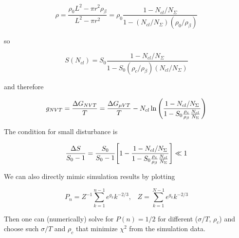 \documentclass[a4paper,12pt]{article} %
\begin{document}
\begin{equation}
\rho = \frac{\rho_0 L^2 - \pi r^2 \rho_{\beta}}{L^2 - \pi r^2} = \rho_0 \frac{1 - N_{cl} / N_{\Sigma}}{1 - (N_{cl} / N_{\Sigma})(\rho_0 / \rho_{\beta})}
\end{equation}

so

\begin{equation}
S(N_{cl}) = S_0 \frac{1 - N_{cl} / N_{\Sigma}}{1 - S_0 (\rho_c / \rho_{\beta})(N_{cl} / N_{\Sigma})}
\end{equation}

and therefore

\begin{equation}
g_{NVT} = \frac{\Delta G_{N V T}}{T} = \frac{\Delta G_{\mu V T}}{T} - N_{cl} \ln \qty(\frac{1 - N_{cl} / N_{\Sigma}}{1 - S_0 \frac{\rho_c}{\rho_{\beta}} \frac{N_{cl}}{N_{\Sigma}}})
\end{equation}

The condition for small disturbance is

\begin{equation}
\frac{\Delta S}{S_0 - 1} = \frac{S_0}{S_0 - 1} \qty[1 - \frac{1 - N_{cl} / N_{\Sigma}}{1 - S_0 \frac{\rho_c}{\rho_{\beta}} \frac{N_{cl}}{N_{\Sigma}}}] \ll 1
\end{equation}

We can also directly mimic simulation results by plotting

\begin{equation}
P_n = Z^{-1} \sum_{k=1}^{n-1} e^{g_k} k^{-2/3}, \hspace{10pt} Z = \sum_{k=1}^{N-1} e^{g_k} k^{-2/3}
\end{equation}

Then one can (numerically) solve for $P(n) = 1/2$ for different ($\sigma/T$, $\rho_c$) and choose such $\sigma/T$ and $\rho_c$ that minimize $\chi^2$ from the simulation data.
\end{document}
